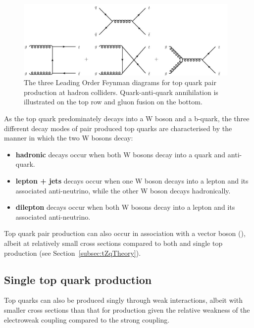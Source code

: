 \begin{figure}[htbp]
\begin{center}
\includegraphics[width=0.97\textwidth]{figs/top-physics/ttbar_feyn.jpg}
\caption{The three Leading Order Feynman diagrams for top quark pair production at hadron colliders. Quark-anti-quark annihilation is illustrated on the top row and gluon fusion on the bottom.}
\label{fig:feyn_ttbar}
\end{center}
\end{figure}

As the top quark predominately decays into a W boson and a b-quark, the three different decay modes of pair produced top quarks are characterised by the manner in which the two W bosons decay:
\begin{itemize}
\item \textbf{hadronic} decays occur when both W bosons decay into a quark and anti-quark.
\item \textbf{lepton + jets} decays occur when one W boson decays into a lepton and its associated anti-neutrino, while the other W boson decays hadronically.
\item \textbf{dilepton} decays occur when both W bosons decay into a lepton and its associated anti-neutrino.
\end{itemize}
 

Top quark pair production can also occur in association with a vector boson (\ttV), albeit at relatively small cross sections compared to both \ttbar and single top production (see Section~\ref{subsec:tZqTheory}).

\subsection{Single top quark production}\label{subsec:singleTopTheory}
Top quarks can also be produced singly through weak interactions, albeit with smaller cross sections than that for \ttbar production given the relative weakness of the electroweak coupling compared to the strong coupling.


